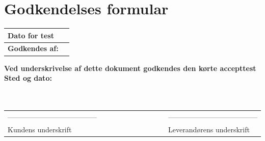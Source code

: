\section{Godkendelses formular}
\begin{table}[h!]
\label{tab:tabel19}
\begin{tabular}{| l | >{\raggedright\arraybackslash}p{12cm} |}
   \hline
   \textbf{Dato for test} &\\ \hline
   \textbf{Godkendes af:} & \\ \hline
\end{tabular}
\end{table}
\textbf{Ved underskrivelse af dette dokument godkendes den kørte accepttest}
\newline
\textbf{Sted og dato:}\\
\\
\\
\begin{table}
[h!]
\begin{tabular}{ l lllllllll l}
--------------------------------------&&&&&&&&&&--------------------------------------\\ 
Kundens underskrift &&&&&&&&&&Leverandørens underskrift\\
\end{tabular}
\end{table}